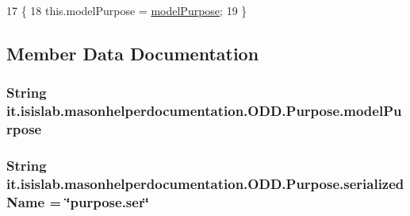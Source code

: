 \begin{DoxyCode}
17                                                     \{
18         this.modelPurpose = \hyperlink{classit_1_1isislab_1_1masonhelperdocumentation_1_1_o_d_d_1_1_purpose_a48dbed6577c51e31a326d1cbd7552f7c}{modelPurpose};
19     \}
\end{DoxyCode}


\subsection{Member Data Documentation}
\hypertarget{classit_1_1isislab_1_1masonhelperdocumentation_1_1_o_d_d_1_1_purpose_a48dbed6577c51e31a326d1cbd7552f7c}{
\subsubsection[{model\-Purpose}]{\setlength{\rightskip}{0pt plus 5cm}String it.\-isislab.\-masonhelperdocumentation.\-O\-D\-D.\-Purpose.\-model\-Purpose\hspace{0.3cm}{\ttfamily [private]}}}\label{classit_1_1isislab_1_1masonhelperdocumentation_1_1_o_d_d_1_1_purpose_a48dbed6577c51e31a326d1cbd7552f7c}
\hypertarget{classit_1_1isislab_1_1masonhelperdocumentation_1_1_o_d_d_1_1_purpose_a56357a152943e75b85a53c796126f99f}{
\subsubsection[{serialized\-Name}]{\setlength{\rightskip}{0pt plus 5cm}String it.\-isislab.\-masonhelperdocumentation.\-O\-D\-D.\-Purpose.\-serialized\-Name = \char`\"{}purpose.\-ser\char`\"{}\hspace{0.3cm}{\ttfamily [static]}}}\label{classit_1_1isislab_1_1masonhelperdocumentation_1_1_o_d_d_1_1_purpose_a56357a152943e75b85a53c796126f99f}

